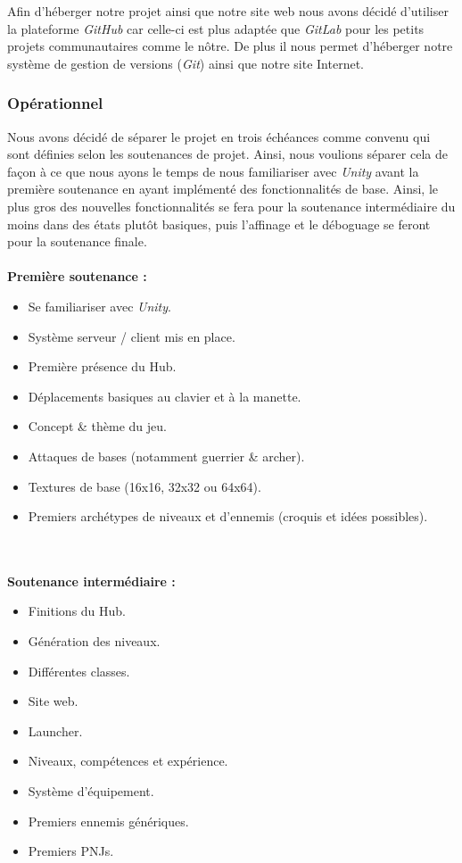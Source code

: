 \documentclass{article}
\begin{document}
Afin d'héberger notre projet ainsi que notre site web nous avons décidé d'utiliser la plateforme \textit{GitHub} car celle-ci est plus adaptée que \textit{GitLab} pour les petits projets communautaires comme le nôtre. De plus il nous permet d'héberger notre système de gestion de versions (\textit{Git}) ainsi que notre site Internet.

\pagebreak

\subsubsection{Opérationnel}


Nous avons décidé de séparer le projet en trois échéances comme convenu qui sont définies selon les soutenances de projet. Ainsi, nous voulions séparer cela de façon à ce que nous ayons le temps de nous familiariser avec \textit{Unity} avant la première soutenance en ayant implémenté des fonctionnalités de base. Ainsi, le plus gros des nouvelles fonctionnalités se fera pour la soutenance intermédiaire du moins dans des états plutôt basiques, puis l'affinage et le déboguage se feront pour la soutenance finale. \\ \\

\noindent \large\textbf{Première soutenance :}
\normalsize
\begin{itemize}
    \item Se familiariser avec \textit{Unity}.
    \item Système serveur / client mis en place.
    \item Première présence du Hub.
    \item Déplacements basiques au clavier et à la manette.
    \item Concept \& thème du jeu.
    \item Attaques de bases (notamment guerrier \& archer).
    \item Textures de base (16x16, 32x32 ou 64x64).
    \item Premiers archétypes de niveaux et d'ennemis (croquis et idées possibles).
\end{itemize}

\ \\ \\

\noindent \large\textbf{Soutenance intermédiaire :}
\normalsize
\begin{itemize}
    \item Finitions du Hub.
    \item Génération des niveaux.
    \item Différentes classes.
    \item Site web.
    \item Launcher.
    \item Niveaux, compétences et expérience.
    \item Système d'équipement.
    \item Premiers ennemis génériques.
    \item Premiers PNJs.
\end{itemize}
\end{document}
